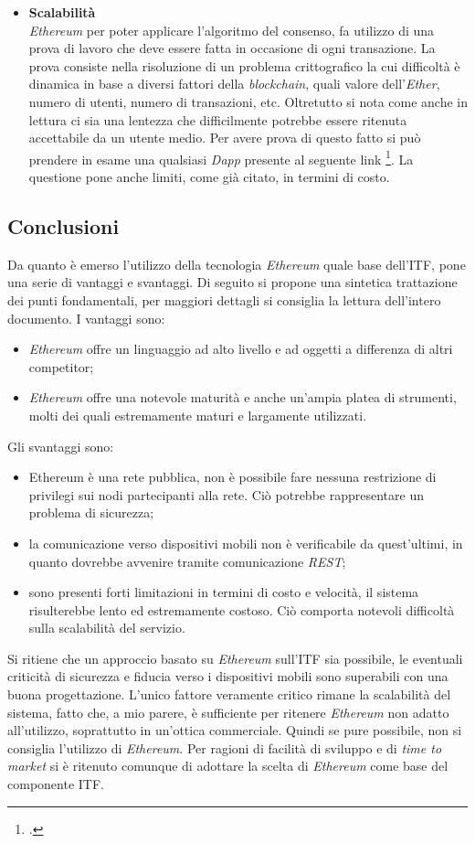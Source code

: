 \begin{itemize}
    \item \textbf{Scalabilità}\\
    \emph{Ethereum} per poter applicare l’algoritmo del consenso, fa utilizzo di una prova di lavoro che deve essere fatta in occasione di ogni transazione. La prova consiste nella risoluzione di un problema crittografico la cui difficoltà è dinamica in base a diversi fattori della \emph{blockchain}, quali valore dell’\emph{Ether}, numero di utenti, numero di transazioni, etc. Oltretutto si nota come anche in lettura ci sia una lentezza che difficilmente potrebbe essere ritenuta accettabile da un utente medio. Per avere prova di questo fatto si può prendere in esame una qualsiasi \emph{Dapp} presente al seguente link \footcite{site:state-dapps}. La questione pone anche limiti, come già citato, in termini di costo.
\end{itemize}
\subsection{Conclusioni}
Da quanto è emerso l’utilizzo della tecnologia \emph{Ethereum} quale base dell’ITF, pone una serie di vantaggi e svantaggi. Di seguito si propone una sintetica trattazione dei punti fondamentali, per maggiori dettagli si consiglia la lettura dell’intero documento.
I vantaggi sono:
\begin{itemize}
    \item \emph{Ethereum} offre un linguaggio ad alto livello e ad oggetti a differenza di altri competitor;
    \item \emph{Ethereum} offre una notevole maturità e anche un’ampia platea di strumenti, molti dei quali estremamente maturi e largamente utilizzati.
\end{itemize}
    
Gli svantaggi sono: 
\begin{itemize}
    \item Ethereum è una rete pubblica, non è possibile fare nessuna restrizione di privilegi sui nodi partecipanti alla rete. Ciò potrebbe rappresentare un problema di sicurezza;
    \item la comunicazione verso dispositivi mobili non è verificabile da quest’ultimi, in quanto dovrebbe avvenire tramite comunicazione \emph{REST};
    \item sono presenti forti limitazioni in termini di costo e velocità, il sistema risulterebbe lento ed estremamente costoso. Ciò comporta notevoli difficoltà sulla scalabilità del servizio.
\end{itemize}
Si ritiene che un approccio basato su \emph{Ethereum} sull’ITF sia possibile, le eventuali criticità di sicurezza e fiducia verso i dispositivi mobili sono superabili con una buona progettazione. L’unico fattore veramente critico rimane la scalabilità del sistema, fatto che, a mio parere, è sufficiente per ritenere \emph{Ethereum} non adatto all’utilizzo, soprattutto in un’ottica commerciale. Quindi se pure possibile, non si consiglia l’utilizzo di \emph{Ethereum}. Per ragioni di facilità di sviluppo e di \emph{time to market} si è ritenuto comunque di adottare la scelta di \emph{Ethereum} come base del componente ITF.

